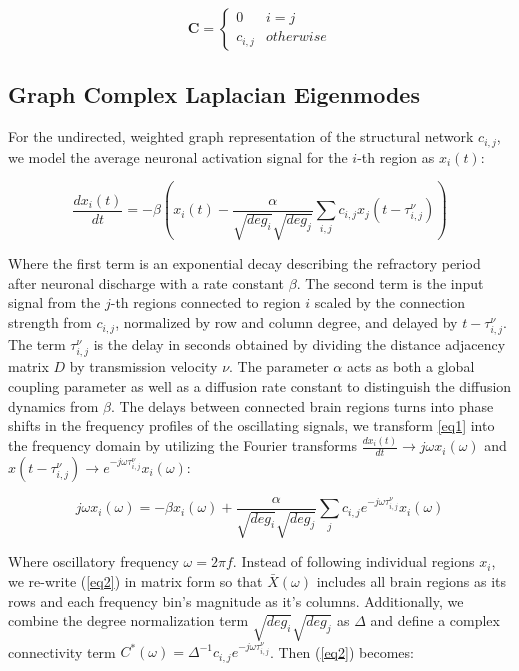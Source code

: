 \documentclass{article}
\begin{document}
\[ \mathbf{C} = \begin{cases}
    0 & i = j\\
    c_{i,j} & otherwise
    \end{cases}
    \]

\subsection{Graph Complex Laplacian Eigenmodes}
For the undirected, weighted graph representation of the structural network $c_{i,j}$, we model the average neuronal activation signal for the $i$-th region as $x_{i}(t)$:

\begin{equation} \label{eq1}
\frac{dx_{i}(t)}{dt} = -\beta (x_{i}(t) - \frac{\alpha}{\sqrt{deg_i}\sqrt{deg_j}} \sum_{i,j} c_{i,j} x_{j}(t-\tau^{\nu}_{i,j}))
\end{equation} 

Where the first term is an exponential decay describing the refractory period after neuronal discharge with a rate constant $\beta$. The second term is the input signal from the $j$-th regions connected to region $i$ scaled by the connection strength from $c_{i,j}$, normalized by row and column degree, and delayed by $t-\tau^{\nu}_{i,j}$. The term $\tau^{\nu}_{i,j}$ is the delay in seconds obtained by dividing the distance adjacency matrix $D$ by transmission velocity $\nu$. The parameter $\alpha$ acts as both a global coupling parameter as well as a diffusion rate constant to distinguish the diffusion dynamics from $\beta$. The delays between connected brain regions turns into phase shifts in the frequency profiles of the oscillating signals, we transform \ref{eq1} into the frequency domain by utilizing the Fourier transforms $\frac{dx_{i}(t)}{dt} \to j\omega x_{i}(\omega)$ and $x(t-\tau^{\nu}_{i,j}) \to e^{-j\omega \tau^{\nu}_{i,j}} x_{i}(\omega)$:

\begin{equation}
\label{eq2}
j\omega x_{i}(\omega) = -\beta x_{i}(\omega) + \frac{\alpha}{\sqrt{deg_i}\sqrt{deg_j}} \sum_j c_{i,j} e^{-j\omega \tau^{\nu}_{i,j}} x_{i}(\omega)
\end{equation}

Where oscillatory frequency $\omega = 2 \pi f$. Instead of following individual regions $x_{i}$, we re-write (\ref{eq2}) in matrix form so that $\bar{X}(\omega)$ includes all brain regions as its rows and each frequency bin's magnitude as it's columns. Additionally, we combine the degree normalization term $\sqrt{deg_i}\sqrt{deg_j}$ as $\Delta$ and define a complex connectivity term $C^{*}(\omega) = \Delta^{-1} c_{i,j}e^{-j\omega \tau^{\nu}_{i,j}}$. Then (\ref{eq2}) becomes:
\end{document}
